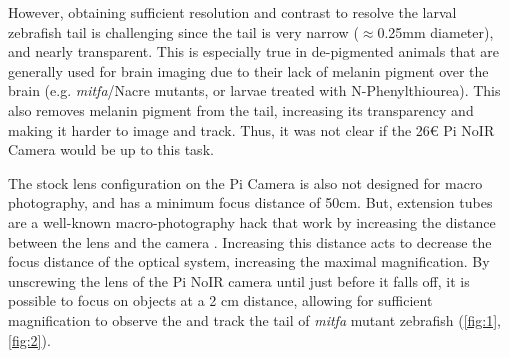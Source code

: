 \documentclass[9pt,lineno]{RandlettLab_elife}
\begin{document}
However, obtaining sufficient resolution and contrast to resolve the larval zebrafish tail is challenging since the tail is very narrow ($\approx$0.25mm diameter), and nearly transparent. This is especially true in de-pigmented animals that are generally used for brain imaging due to their lack of melanin pigment over the brain (e.g. \textit{mitfa}/Nacre mutants, or larvae treated with N-Phenylthiourea). This also removes melanin pigment from the tail, increasing its transparency and making it harder to image and track. Thus, it was not clear if the 26€ Pi NoIR Camera would be up to this task. 

The stock lens configuration on the Pi Camera is also not designed for macro photography, and has a minimum focus distance of 50cm. But, extension tubes are a well-known macro-photography hack that work by increasing the distance between the lens and the camera \citep{enwiki:1118116052}. Increasing this distance acts to decrease the focus distance of the optical system, increasing the maximal magnification. By unscrewing the lens of the Pi NoIR camera until just before it falls off, it is possible to focus on objects at a 2 cm distance, allowing for sufficient magnification to observe the and track the tail of \textit{mitfa} mutant zebrafish (\autoref{fig:1}, \autoref{fig:2}).
\end{document}
